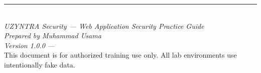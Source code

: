 \vfill

\begin{center}
{\color{uzgray}\rule{0.6\textwidth}{0.4pt}}\\[8pt]
\textit{UZYNTRA Security — Web Application Security Practice Guide}\\
\textit{Prepared by Muhammad Usama}\\
\textit{Version 1.0.0 — \DTMtoday}\\[4pt]
{\small\textcolor{uzgray}{This document is for authorized training use only. All lab environments use intentionally fake data.}}
\end{center}
